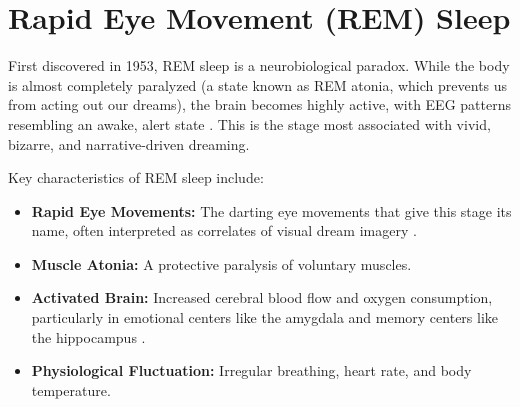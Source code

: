 \section{Rapid Eye Movement (REM) Sleep}\label{sec:rem}

First discovered in 1953, REM sleep is a neurobiological paradox. While the body is almost completely paralyzed (a state known as REM atonia, which prevents us from acting out our dreams), the brain becomes highly active, with EEG patterns resembling an awake, alert state \citep{fuller2006}. This is the stage most associated with vivid, bizarre, and narrative-driven dreaming.

Key characteristics of REM sleep include:
\begin{itemize}
    \item \textbf{Rapid Eye Movements:} The darting eye movements that give this stage its name, often interpreted as correlates of visual dream imagery \citep{fuller2006}.
    \item \textbf{Muscle Atonia:} A protective paralysis of voluntary muscles.
    \item \textbf{Activated Brain:} Increased cerebral blood flow and oxygen consumption, particularly in emotional centers like the amygdala and memory centers like the hippocampus \citep{fuller2006}.
    \item \textbf{Physiological Fluctuation:} Irregular breathing, heart rate, and body temperature.
\end{itemize}
